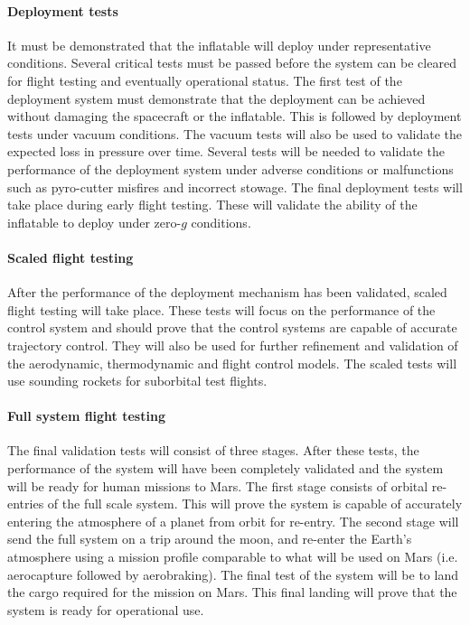 \paragraph{Deployment tests}
It must be demonstrated that the inflatable will deploy under representative conditions. Several critical tests must be passed before the system can be cleared for flight testing and eventually operational status. The first test of the deployment system must demonstrate that the deployment can be achieved without damaging the spacecraft or the inflatable. This is followed by deployment tests under vacuum conditions. The vacuum tests will also be used to validate the expected loss in pressure over time. Several tests will be needed to validate the performance of the deployment system under adverse conditions or malfunctions such as pyro-cutter misfires and incorrect stowage. The final deployment tests will take place during early flight testing. These will validate the ability of the inflatable to deploy under zero-$g$ conditions. 

\paragraph{Scaled flight testing}
After the performance of the deployment mechanism has been validated, scaled flight testing will take place. These tests will focus on the  performance of the control system and should prove that the control systems are capable of accurate trajectory control. They will also be used for further refinement and validation of the aerodynamic, thermodynamic and flight control models.  The scaled tests will use sounding rockets for suborbital test flights.

\paragraph{Full system flight testing}
The final validation tests will consist of three stages. After these tests, the performance of the system will have been completely validated and the system will be ready for human missions to Mars. The first stage consists of orbital re-entries of the full scale system. This will prove the system is capable of accurately entering the atmosphere of a  planet from orbit for re-entry. The second stage will send the full system on a trip around the moon, and re-enter the Earth's atmosphere using a mission profile comparable to what will be used on Mars (i.e. aerocapture followed by aerobraking). The final test of the system will be to land the cargo required for the mission on Mars. This final landing will prove that the system is ready for operational use. 




